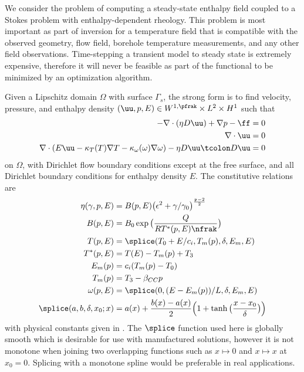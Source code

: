 We consider the problem of computing a steady-state enthalpy field coupled to a Stokes problem with enthalpy-dependent rheology.
This problem is most important as part of inversion for a temperature field that is compatible with the observed geometry, flow field, borehole temperature measurements, and any other field observations.
Time-stepping a transient model to steady state is extremely expensive, therefore it will never be feasible as part of the functional to be minimized by an optimization algorithm.

Given a Lipschitz domain $\Omega$ with surface $\Gamma_s$, the strong form is to find velocity, pressure, and enthalpy density $(\uu,p,E) \in W^{1,\pfrak} \times L^2 \times H^1$ such that
\begin{align}
    -\nabla \cdot(\eta D\uu) + \nabla p - \ff &= 0 \\
    \nabla \cdot \uu &= 0 \\
    \nabla\cdot (E\uu - \kappa_T(T)\nabla T - \kappa_\omega(\omega)\nabla \omega) - \eta D\uu\tcolon D\uu &= 0
\end{align}
on $\Omega$, with Dirichlet flow boundary conditions except at the free surface, and all Dirichlet boundary conditions for enthalpy density $E$.
The constitutive relations are
\begin{align}
  \eta(\gamma,p,E)            & = B(p,E)\big(\epsilon^2 + \gamma/\gamma_0 \big)^{\frac{\mathfrak{p}-2}{2}} \\
  B(p,E)                      & = B_0 \exp \big( \frac{Q}{RT^*(p,E)\nfrak} \big)                                \\
  T(p,E)                    & = \splice(T_0 + E/c_i,T_m(p),\delta,E_m,E)                            \\
  T^*(p,E)                  & = T(E) - T_m(p) + T_3                                                    \\
  E_m(p)                    & = c_i (T_m(p) - T_0)                                                     \\
  T_m(p)                    & = T_3 - \beta_{CC} p                                                     \\
  \omega(p,E)               & = \splice (0,(E-E_m(p))/L,\delta,E_m,E)                                   \\
  \splice(a,b,\delta,x_0;x) & = a(x) + \frac{b(x)-a(x)}{2} \Big(1+\tanh \big(\frac{x-x_0}{\delta} \big) \Big)        \\
\end{align}
with physical constants given in .
The $\splice$ function used here is globally smooth which is desirable for use with manufactured solutions, however it is not monotone when joining two overlapping functions such as $x \mapsto 0$ and $x \mapsto x$ at $x_0 = 0$.
Splicing with a monotone spline would be preferable in real applications.

